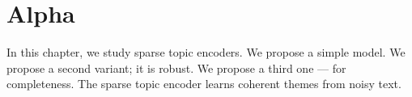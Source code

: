 \chapter{Alpha}
In this chapter, we study sparse topic encoders. We propose a simple model.
We propose a second variant; it is robust. We propose a third one --- for
completeness. The sparse topic encoder learns coherent themes from noisy text.

